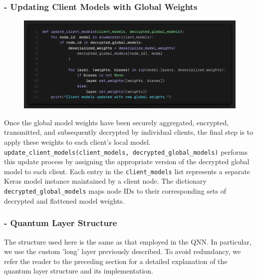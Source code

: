 \documentclass[10pt]{article}
\begin{document}
\subsubsection*{- Updating Client Models with Global Weights}
\begin{figure}[H]
	\centering
	\includegraphics[height = 0.2\textheight]{img/QFL_code/5.png}
\end{figure}
Once the global model weights have been securely aggregated, encrypted, transmitted, and subsequently decrypted by individual clients, the final step is to apply these weights to each client's local model.\\
\texttt{update\_client\_models(client\_models, decrypted\_global\_models)} performs this update process by assigning the appropriate version of the decrypted global model to each client.
Each entry in the \texttt{client\_models} list represents a separate Keras model instance maintained by a client node. The dictionary \texttt{decrypted\_global\_models} maps node IDs to their corresponding sets of decrypted and flattened model weights.


\subsubsection*{- Quantum Layer Structure}
The structure used here is the same as that employed in the QNN. In particular, we use the custom 'long' layer previously described. To avoid redundancy, we refer the reader to the preceding section for a detailed explanation of the quantum layer structure and its implementation.
\end{document}
